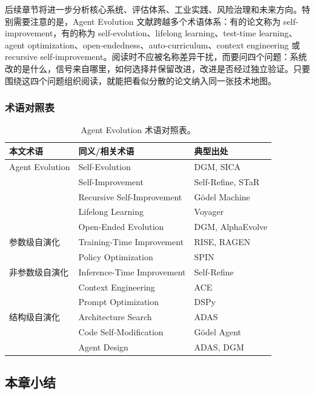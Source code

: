 后续章节将进一步分析核心系统、评估体系、工业实践、风险治理和未来方向。特别需要注意的是，Agent Evolution 文献跨越多个术语体系：有的论文称为 self-improvement，有的称为 self-evolution、lifelong learning、test-time learning、agent optimization、open-endedness、auto-curriculum、context engineering 或 recursive self-improvement。阅读时不应被名称差异干扰，而要问四个问题：系统改的是什么，信号来自哪里，如何选择并保留改进，改进是否经过独立验证。只要围绕这四个问题组织阅读，就能把看似分散的论文纳入同一张技术地图。

\subsubsection{术语对照表}

\begin{table}[htbp]
\centering
\caption{Agent Evolution 术语对照表。}
\label{tab:terminology}
\begin{tabular}{lll}
\toprule
\textbf{本文术语} & \textbf{同义/相关术语} & \textbf{典型出处} \\
\midrule
Agent Evolution & Self-Evolution & DGM, SICA \\
& Self-Improvement & Self-Refine, STaR \\
& Recursive Self-Improvement & Gödel Machine \\
& Lifelong Learning & Voyager \\
& Open-Ended Evolution & DGM, AlphaEvolve \\
\midrule
参数级自演化 & Training-Time Improvement & RISE, RAGEN \\
& Policy Optimization & SPIN \\
\midrule
非参数级自演化 & Inference-Time Improvement & Self-Refine \\
& Context Engineering & ACE \\
& Prompt Optimization & DSPy \\
\midrule
结构级自演化 & Architecture Search & ADAS \\
& Code Self-Modification & Gödel Agent \\
& Agent Design & ADAS, DGM \\
\bottomrule
\end{tabular}
\end{table}

\subsection{本章小结}\label{sec:intro-summary}

